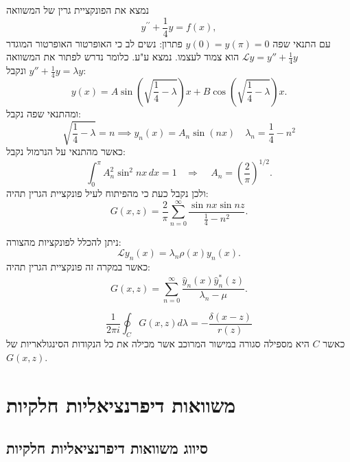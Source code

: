 \documentclass{tstextbook}
\begin{document}
\begin{example}
נמצא את הפונקציית גרין של המשוואה $$y^{\prime\prime}+{\textstyle{\frac{1}{4}}}y=f(x),$$
עם התנאי שפה \(y(0)=y\left( \pi \right)=0\)
פתרון:
נשים לב כי האופרטור האופרטור המוגדר \(\mathcal{L}y=y''+\frac{1}{4}y\) הוא צמוד לעצמו. נמצא ע"ע. כלומר נדרש לפתור את המשוואה \(y''+\frac{1}{4}y=\lambda y\) ונקבל:
$$y(x)=A\sin\left(\sqrt{{\frac{1}{4}}-\lambda}\right)x+B\cos\left(\sqrt{{\frac{1}{4}}-\lambda}\right)x.$$
ומהתנאי שפה נקבל:
$$\sqrt{{\textstyle{\frac{1}{4}}}-\lambda}=n \implies y_{n}(x)=A_{n}\sin(nx)\quad \lambda_{n}=\frac{1}{4}-n^2$$
כאשר מהתנאי על הנרמול נקבל:
$$\int_{0}^{\pi}A_{n}^{2}\sin^{2}n x\,d x=1~~~~\Rightarrow~~~~~A_{n}=\left({\frac{2}{\pi}}\right)^{1/2}.$$
ולכן נקבל כעת כי מהפיתוח לעיל פונקציית הגרין תהיה:
$$G(x,z)={\frac{2}{\pi}}\sum_{n=0}^{\infty}{\frac{\sin n x\sin n z}{{\frac{1}{4}}-n^{2}}}.$$

\end{example}
\begin{proposition}
ניתן להכלל לפונקציות מהצורה:
$${\mathcal L}y_{n}(x)=\lambda_{n}\rho(x)y_{n}(x).$$
כאשר במקרה זה פונקציית הגרין תהיה:
$$G(x,z)=\sum_{n=0}^{\infty}{\frac{{\hat{y}}_{n}(x){\hat{y}}_{n}^{*}(z)}{\lambda_{n}-\mu}}.$$

\end{proposition}
\begin{corollary}
$$\frac{1}{2\pi i}\oint_{C} G(x,z)d\lambda=-\frac{\delta(x-z)}{r(z)}$$
כאשר \(C\) היא מספילה סגורה במישור המרוכב אשר מכילה את כל הנקודות הסינגולאריות של \(G(x,z)\).

\end{corollary}
\section{משוואות דיפרנציאליות חלקיות}

\subsection{סיווג משוואות דיפרנציאליות חלקיות}
\end{document}
